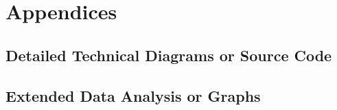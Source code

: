 \chapter{Appendices}

\section{Detailed Technical Diagrams or Source Code}

\section{Extended Data Analysis or Graphs}